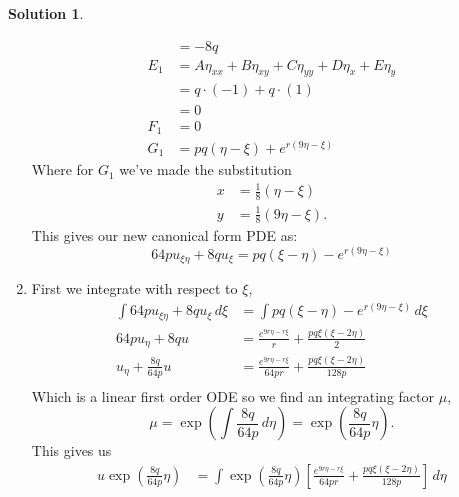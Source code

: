 \documentclass[10pt]{article}
\theoremstyle{definition}
\newtheorem{soln}{Solution}
\begin{document}
\begin{soln}
\begin{enumerate}[label=(\alph*)]
\begin{align*}
                & =-8q                                                               \\
            E_1 & =A\eta_{xx}+B\eta_{xy}+C\eta_{yy}+D\eta_{x}+E\eta_{y}              \\
                & =q\cdot(-1)+q\cdot(1)                                              \\
                & =0                                                                 \\
            F_1 & =0                                                                 \\
            G_1 & =pq\left(\eta-\xi\right)+e^{r\left(9\eta-\xi\right)}
          \end{align*}
          Where for $G_1$ we've made the substitution
          \begin{align*}
            x & =\frac{1}{8}\left(\eta-\xi\right)   \\
            y & =\frac{1}{8}\left(9\eta-\xi\right).
          \end{align*}
          This gives our new canonical form PDE as:
          $$64pu_{\xi\eta}+8qu_\xi=pq\left(\xi-\eta\right)-e^{r\left(9\eta-\xi\right)}$$
    \item First we integrate with respect to $\xi$,
          \begin{align*}
            \int64pu_{\xi\eta}+8qu_\xi\,d\xi & =\int pq\left(\xi-\eta\right)-e^{r\left(9\eta-\xi\right)}\,d\xi                         \\
            64pu_{\eta}+8qu                  & =\frac{e^{9r{\eta} - r{\xi}}}{r} + \frac{pq{\xi} \left({\xi} - 2{\eta}\right)}{2}       \\
            u_{\eta}+\frac{8q}{64p}u         & =\frac{e^{9r{\eta} - r{\xi}}}{64pr} + \frac{pq{\xi} \left({\xi} - 2{\eta}\right)}{128p} \\
          \end{align*}
          Which is a linear first order ODE so we find an integrating factor $\mu$,
          $$\mu=\exp\left(\int\frac{8q}{64p}\,d\eta\right)=\exp\left(\frac{8q}{64p}\eta\right).$$
          This gives us
          \begin{align*}
            u\exp\left(\frac{8q}{64p}\eta\right) & =\int\exp\left(\frac{8q}{64p}\eta\right)
            \left[\frac{e^{9r{\eta} - r{\xi}}}{64pr} + \frac{pq{\xi} \left({\xi} - 2{\eta}\right)}{128p}\right]\,d\eta                                                                                                                                                         \\

\end{align*}
\end{enumerate}
\end{soln}
\end{document}

